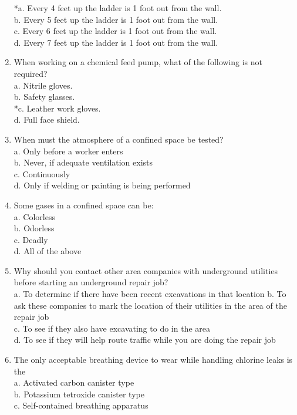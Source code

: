 \begin{enumerate}[1.]
*a. Every 4 feet up the ladder is 1 foot out from the wall.\\
b. Every 5 feet up the ladder is 1 foot out from the wall.\\
c. Every 6 feet up the ladder is 1 foot out from the wall.\\
d. Every 7 feet up the ladder is 1 foot out from the wall.\\
\item When working on a chemical feed pump, what of the following is not required?\\
a. Nitrile gloves.\\
b. Safety glasses.\\
*c. Leather work gloves.\\
d. Full face shield.\\
\item When must the atmosphere of a confined space be tested?\\
a. Only before a worker enters\\
b. Never, if adequate ventilation exists\\
c. Continuously\\
d. Only if welding or painting is being performed\\
\item Some gases in a confined space can be:\\
a. Colorless\\
b. Odorless\\
c. Deadly\\
d. All of the above\\
\item Why should you contact other area companies with underground utilities before starting an underground repair job?\\
a. To determine if there have been recent excavations in that location b. To ask these companies to mark the location of their utilities in the area of the repair job\\
c. To see if they also have excavating to do in the area\\
d. To see if they will help route traffic while you are doing the repair job\\
\item The only acceptable breathing device to wear while handling chlorine leaks is the\\
a. Activated carbon canister type\\
b. Potassium tetroxide canister type\\
c. Self-contained breathing apparatus\\

\end{enumerate}
